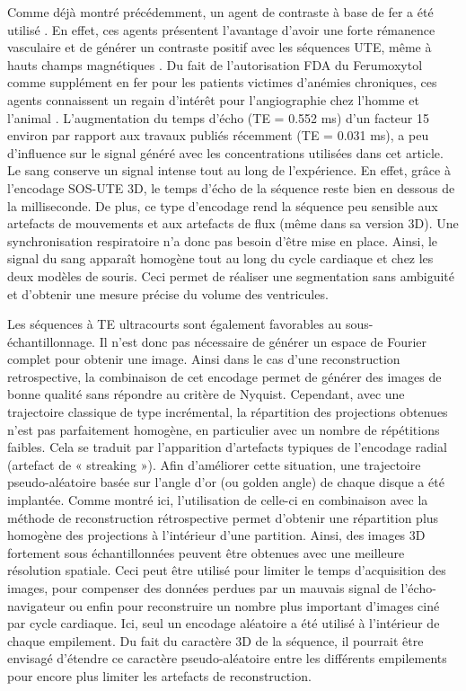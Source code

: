 Comme déjà montré précédemment, un agent de contraste à base de fer a été utilisé \cite{trotier2015positive}. En effet, ces agents présentent l’avantage d’avoir une forte rémanence vasculaire et de générer un contraste positif avec les séquences UTE, même à hauts champs magnétiques \cite{Gharagouzloo2015Quantitative-co}. Du fait de l’autorisation FDA du Ferumoxytol comme supplément en fer pour les patients victimes d’anémies chroniques, ces agents connaissent un regain d’intérêt pour l’angiographie chez l’homme et l’animal \cite{ruangwattanapaisarn2014ferumoxytol}. L’augmentation du temps d’écho (TE = 0.552 ms) d’un facteur 15 environ par rapport aux travaux publiés récemment (TE = 0.031 ms), a peu d’influence sur le signal généré avec les concentrations utilisées dans cet article. Le sang conserve un signal intense tout au long de l’expérience. En effet, grâce à l’encodage SOS-UTE 3D, le temps d’écho de la séquence reste bien en dessous de la milliseconde. De plus, ce type d’encodage rend la séquence peu sensible aux artefacts de mouvements et aux artefacts de flux (même dans sa version 3D). Une synchronisation respiratoire n’a donc pas besoin d’être mise en place. Ainsi, le signal du sang apparaît homogène tout au long du cycle cardiaque et chez les deux modèles de souris. Ceci permet de réaliser une segmentation sans ambiguité et d'obtenir une mesure précise du volume des ventricules. 

Les séquences à TE ultracourts sont également favorables au sous-échantillonnage. Il n’est donc pas nécessaire de générer un espace de Fourier complet pour obtenir une image. Ainsi dans le cas d'une reconstruction retrospective, la combinaison de cet encodage permet de générer des images de bonne qualité sans répondre au critère de Nyquist. Cependant, avec une trajectoire classique de type incrémental, la répartition des projections obtenues n’est pas parfaitement homogène, en particulier avec un nombre de répétitions faibles. Cela se traduit par l’apparition d'artefacts typiques de l'encodage radial (artefact de « streaking »).
Afin d’améliorer cette situation, une trajectoire pseudo-aléatoire basée sur l’angle d’or (ou golden angle) de chaque disque a été implantée. Comme montré ici, l’utilisation de celle-ci en combinaison avec la méthode de reconstruction rétrospective permet d’obtenir une répartition plus homogène des projections à l’intérieur d’une partition. Ainsi, des images 3D fortement sous échantillonnées peuvent être obtenues avec une meilleure résolution spatiale. Ceci peut être utilisé pour limiter le temps d’acquisition des images, pour compenser des données perdues par un mauvais signal de l’écho-navigateur ou enfin pour reconstruire un nombre plus important d’images ciné par cycle cardiaque. Ici, seul un encodage aléatoire a été utilisé à l’intérieur de chaque empilement. Du fait du caractère 3D de la séquence, il pourrait être envisagé d’étendre ce caractère pseudo-aléatoire entre les différents empilements pour encore plus limiter les artefacts de reconstruction.

